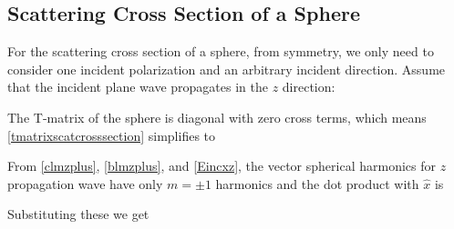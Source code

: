 {\footnotesize
{}
}

%

%
%
%


\subsection{Scattering Cross Section of a Sphere}

For the scattering cross section of a sphere, from symmetry, we only need to consider one incident polarization and an arbitrary incident direction. Assume that the incident plane wave propagates in the $z$ direction:

The T-matrix of the sphere is diagonal with zero cross terms, which means \eqref{tmatrixscatcrosssection} simplifies to

From \eqref{clmzplus}, \eqref{blmzplus}, and \eqref{Eincxz}, the vector spherical harmonics for $z$ propagation wave have only $m=\pm1$ harmonics and the dot product with $\hat{x}$ is

Substituting these we get 

